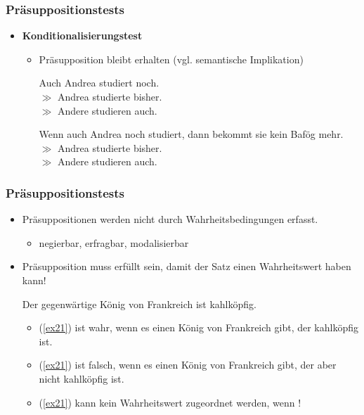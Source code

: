 
\begin{frame}
\frametitle{Präsuppositionstests}

\begin{itemize}
\item \textbf{Konditionalisierungstest}

\vspace{5mm}

	\begin{itemize}
		\item Präsupposition bleibt erhalten (vgl. semantische Implikation)
		
		\ea Auch Andrea studiert noch.\\
			$\gg$ Andrea studierte bisher.\\
			$\gg$ Andere studieren auch.
		\z

			\ea Wenn auch Andrea noch studiert, dann bekommt sie kein Bafög mehr. \\
			$\gg$ Andrea studierte bisher.\\
			$\gg$ Andere studieren auch.
		\z

	\end{itemize}
	
\end{itemize}

\end{frame}



\begin{frame}
\frametitle{Präsuppositionstests}

\begin{itemize}
	\item Präsuppositionen werden nicht durch Wahrheitsbedingungen erfasst.
	
	\begin{itemize}
		\item negierbar, erfragbar, modalisierbar
	\end{itemize}
	
	\item Präsupposition muss erfüllt sein, damit der Satz einen Wahrheitswert haben kann!
	
	\ea \label{ex21} Der gegenwärtige König von Frankreich ist kahlköpfig.
	\z
		
		\begin{itemize}
			\item (\ref{ex21}) ist wahr, wenn es einen König von Frankreich gibt, der kahlköpfig ist.
			\item (\ref{ex21}) ist falsch, wenn es einen König von Frankreich gibt, der aber nicht kahlköpfig ist.
			\item (\ref{ex21}) kann kein Wahrheitswert zugeordnet werden, wenn !
		\end{itemize}

\end{itemize}

\end{frame}


